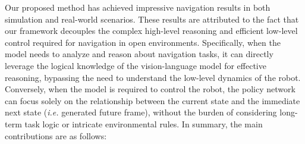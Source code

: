 Our proposed method has achieved impressive navigation results in both simulation and real-world scenarios. These results are attributed to the fact that our framework decouples the complex high-level reasoning and efficient low-level control required for navigation in open environments.
%
Specifically, when the model needs to analyze and reason about navigation tasks, it can directly leverage the logical knowledge of the vision-language model for effective reasoning, bypassing the need to understand the low-level dynamics of the robot.
%
Conversely, when the model is required to control the robot, the policy network can focus solely on the relationship between the current state and the immediate next state (\textit{i.e.} generated future frame), without the burden of considering long-term task logic or intricate environmental rules.
%
%
%
%
%
%
In summary, the main contributions are as follows:

